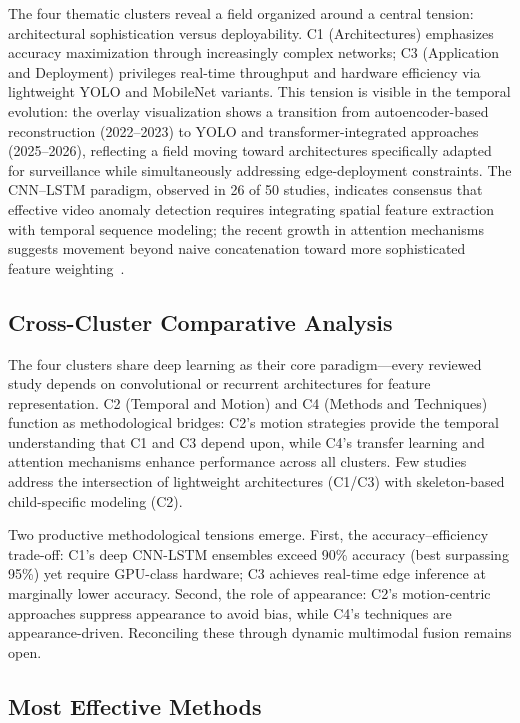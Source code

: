 \documentclass[conference]{IEEEtran}
\begin{document}
The four thematic clusters reveal a field organized around a central tension: architectural sophistication versus deployability. C1 (Architectures) emphasizes accuracy maximization through increasingly complex networks; C3 (Application and Deployment) privileges real-time throughput and hardware efficiency via lightweight YOLO and MobileNet variants. This tension is visible in the temporal evolution: the overlay visualization shows a transition from autoencoder-based reconstruction (2022--2023) to YOLO and transformer-integrated approaches (2025--2026), reflecting a field moving toward architectures specifically adapted for surveillance while simultaneously addressing edge-deployment constraints. The CNN--LSTM paradigm, observed in 26 of 50 studies, indicates consensus that effective video anomaly detection requires integrating spatial feature extraction with temporal sequence modeling; the recent growth in attention mechanisms suggests movement beyond naive concatenation toward more sophisticated feature weighting~\cite{b5,b17}.

\subsection{Cross-Cluster Comparative Analysis}

The four clusters share deep learning as their core paradigm---every reviewed study depends on convolutional or recurrent architectures for feature representation. C2 (Temporal and Motion) and C4 (Methods and Techniques) function as methodological bridges: C2's motion strategies provide the temporal understanding that C1 and C3 depend upon, while C4's transfer learning and attention mechanisms enhance performance across all clusters. Few studies address the intersection of lightweight architectures (C1/C3) with skeleton-based child-specific modeling (C2).

Two productive methodological tensions emerge. First, the accuracy--efficiency trade-off: C1's deep CNN-LSTM ensembles exceed 90\% accuracy (best surpassing 95\%) yet require GPU-class hardware; C3 achieves real-time edge inference at marginally lower accuracy. Second, the role of appearance: C2's motion-centric approaches suppress appearance to avoid bias, while C4's techniques are appearance-driven. Reconciling these through dynamic multimodal fusion remains open.

\subsection{Most Effective Methods}
\end{document}
